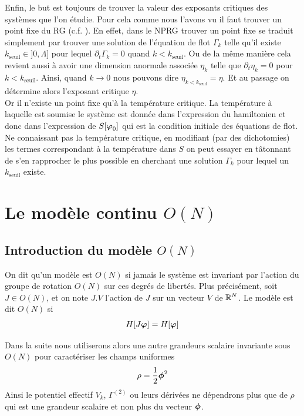 \documentclass[10pt]{article}
\begin{document}
\begin{multicols}{2}
Enfin, le but est toujours de trouver la valeur des exposants critiques des systèmes que l'on étudie. Pour cela comme nous l'avons vu il faut trouver un point fixe du RG (c.f. ). En effet, dans le NPRG trouver un point fixe se traduit simplement par trouver une solution de l'équation de flot $\Gamma_k$ telle qu'il existe $k_\text{seuil} \in ]0, \Lambda]$ pour lequel $\partial_t \Gamma_k = 0$ quand $k<k_\text{seuil}$. Ou de la même manière cela revient aussi à avoir une dimension anormale associée $\eta_k$ telle que $\partial_t \eta_k = 0$ pour $k < k_\text{seuil}$. Ainsi, quand $k \to 0$ nous pouvons dire $\eta_{k<k_\text{seuil}} = \eta$. Et au passage on détermine alors l'exposant critique $\eta$. \\

Or il n'existe un point fixe qu'à la température critique. La température à laquelle est soumise le système est donnée dans l'expression du hamiltonien et donc dans l'expression de $S[\boldsymbol{ \varphi}_0]$ qui est la condition initiale des équations de flot. Ne connaissant pas la température critique, en modifiant (par des dichotomies) les termes correspondant à la température dans $S$ on peut essayer en tâtonnant de s'en rapprocher le plus possible en cherchant une solution $\Gamma_k$ pour lequel un $k_\text{seuil}$ existe.

\newpage
 
\section{Le modèle continu $O(N)$}


\subsection{Introduction du modèle $O(N)$}

On dit qu'un modèle est $O(N)$ si jamais le système est invariant par l'action du groupe de rotation $O(N)$ sur ces degrés de libertés. Plus précisément, soit $J \in O(N)$, et on note $J.V$ l'action de $J$ sur un vecteur $V$ de $\mathbb{R}^N$. Le modèle est dit $O(N)$ si 
\begin{equation}
	H[J \boldsymbol{ \varphi}] = H[\boldsymbol{ \varphi}]	
\end{equation}

Dans la suite nous utiliserons alors une autre grandeurs scalaire invariante sous $O(N)$ pour caractériser les champs uniformes 
\begin{equation}
	\rho = \frac{1}{2}  \boldsymbol{ \phi}^2  
\end{equation}
Ainsi le potentiel effectif $V_k$, $\Gamma^{(2)}$ ou leurs dérivées ne dépendrons plus que de $\rho$ qui est une grandeur scalaire et non plus du vecteur $\boldsymbol{ \phi}$.


\end{multicols}
\end{document}
